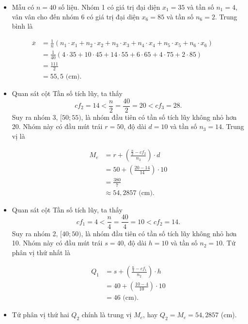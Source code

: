 \documentclass[
  letterpaper,
  DIV=11,
  numbers=noendperiod]{scrartcl}
\providecommand{\tightlist}{%
  \setlength{\itemsep}{0pt}\setlength{\parskip}{0pt}}\usepackage{longtable,booktabs,array}
\begin{document}
\begin{itemize}
\tightlist
\item
  Mẫu có \(n=40\) số liệu. Nhóm 1 có giá trị đại diện \(x_1=35\) và tần
  số \(n_1=4\), vân vân cho đến nhóm 6 có giá trị đại diện \(x_6=85\) và
  tần số \(n_6=2\). Trung bình là
\end{itemize}

\begin{align*}
    \overline{x}
        & = \frac{1}{n}(n_1\cdot x_1 + n_2\cdot x_2 + n_3\cdot x_3 + n_4\cdot x_4 + n_5\cdot x_5 + n_6\cdot x_6) \\
        & = \frac{1}{40} (4\cdot 35 + 10\cdot 45 + 14\cdot 55 + 6\cdot 65 + 4\cdot 75 + 2\cdot 85) \\
        & = \frac{111}{2} \\
        & = 55,5 \text{ (cm).}
\end{align*}

\begin{itemize}
\item
  Quan sát cột Tần số tích lũy, ta thấy \[
  cf_2=14 <\frac{n}{2}=\frac{40}{2}=20 <cf_3=28.
  \] Suy ra nhóm 3, \([50;55)\), là nhóm đầu tiên có tần số tích lũy
  không nhỏ hơn 20. Nhóm này có đầu mút trái \(r=50\), độ dài \(d=10\)
  và tần số \(n_3=14\). Trung vị là

  \begin{align*}
        M_e
            & = r + \left(\frac{\frac{n}{2}-cf_2}{n_3}\right)\cdot d \\
            & = 50 + \left(\frac{20-14}{14}\right)\cdot 10 \\
            & = \frac{380}{7} \\
            & \approx 54,2857 \text{ (cm).}
    \end{align*}
\end{itemize}

\begin{itemize}
\item
  Quan sát cột Tần số tích lũy, ta thấy \[
  cf_1=4 < \frac{n}{4}=\frac{40}{4}=10 < cf_2=14.
  \] Suy ra nhóm 2, \([40;50)\), là nhóm đầu tiên có tần số tích lũy
  không nhỏ hơn 10. Nhóm này có đầu mút trái \(s=40\), độ dài \(h=10\)
  và tần số \(n_2=10\). Tứ phân vị thứ nhất là

  \begin{align*}
        Q_1
            & = s + \left( \frac{\frac{n}{4}-cf_1}{n_2}\right)\cdot h \\
            & = 40 + \left(\frac{10-4}{10}\right)\cdot 10 \\
            & = 46 \text{ (cm).}
    \end{align*}
\item
  Tứ phân vị thứ hai \(Q_2\) chính là trung vị \(M_e\), hay
  \(Q_2 = M_e = 54,2857\) (cm).
\end{itemize}
\end{document}
